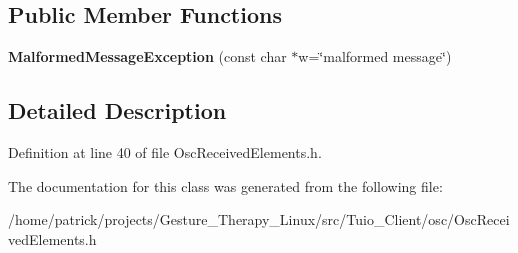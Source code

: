\subsection*{Public Member Functions}
\begin{DoxyCompactItemize}
\item 
\mbox{\label{classosc_1_1_malformed_message_exception_ac720f702cb18c30585cf7926af097b86}} 
{\bfseries Malformed\+Message\+Exception} (const char $\ast$w=\char`\"{}malformed message\char`\"{})
\end{DoxyCompactItemize}


\subsection{Detailed Description}


Definition at line 40 of file Osc\+Received\+Elements.\+h.



The documentation for this class was generated from the following file\+:\begin{DoxyCompactItemize}
\item 
/home/patrick/projects/\+Gesture\+\_\+\+Therapy\+\_\+\+Linux/src/\+Tuio\+\_\+\+Client/osc/Osc\+Received\+Elements.\+h\end{DoxyCompactItemize}
